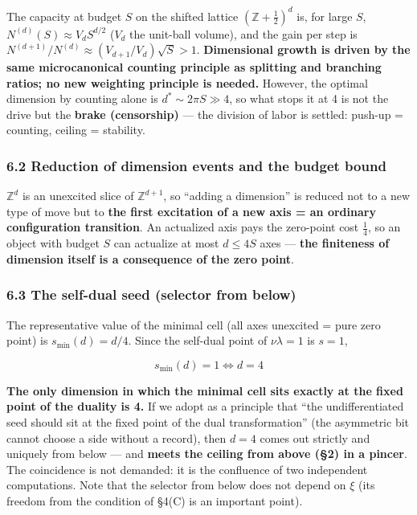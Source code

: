 \documentclass[
]{article}
\begin{document}
The capacity at budget \(S\) on the shifted lattice
\((\mathbb{Z}+\tfrac12)^d\) is, for large \(S\),
\(N^{(d)}(S)\approx V_d S^{d/2}\) (\(V_d\) the unit-ball volume), and
the gain per step is \(N^{(d+1)}/N^{(d)}\approx(V_{d+1}/V_d)\sqrt S>1\).
\textbf{Dimensional growth is driven by the same microcanonical counting
principle as splitting and branching ratios; no new weighting principle
is needed.} However, the optimal dimension by counting alone is
\(d^\ast\sim2\pi S\gg4\), so what stops it at 4 is not the drive but the
\textbf{brake (censorship)} --- the division of labor is settled:
push-up = counting, ceiling = stability.

\subsubsection{6.2 Reduction of dimension events and the budget
bound}\label{reduction-of-dimension-events-and-the-budget-bound}

\(\mathbb{Z}^d\) is an unexcited slice of \(\mathbb{Z}^{d+1}\), so
``adding a dimension'' is reduced not to a new type of move but to
\textbf{the first excitation of a new axis = an ordinary configuration
transition}. An actualized axis pays the zero-point cost \(\tfrac14\),
so an object with budget \(S\) can actualize at most \(d\le4S\) axes ---
\textbf{the finiteness of dimension itself is a consequence of the zero
point}.

\subsubsection{6.3 The self-dual seed (selector from
below)}\label{the-self-dual-seed-selector-from-below}

The representative value of the minimal cell (all axes unexcited = pure
zero point) is \(s_{\min}(d)=d/4\). Since the self-dual point of
\(\nu\lambda=1\) is \(s=1\),

\[
s_{\min}(d)=1\iff d=4
\]

\textbf{The only dimension in which the minimal cell sits exactly at the
fixed point of the duality is 4.} If we adopt as a principle that ``the
undifferentiated seed should sit at the fixed point of the dual
transformation'' (the asymmetric bit cannot choose a side without a
record), then \(d=4\) comes out strictly and uniquely from below --- and
\textbf{meets the ceiling from above (§2) in a pincer}. The coincidence
is not demanded: it is the confluence of two independent computations.
Note that the selector from below does not depend on \(\xi\) (its
freedom from the condition of §4(C) is an important point).
\end{document}
